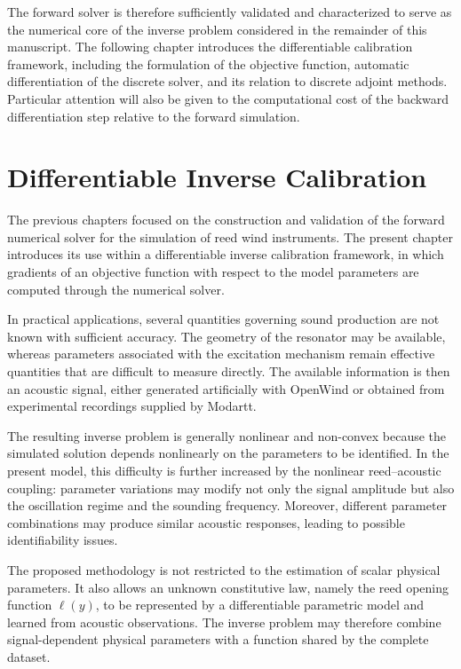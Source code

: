 \documentclass[11pt,a4paper]{report}
\theoremstyle{plain}
\theoremstyle{definition}
\begin{document}
The forward solver is therefore sufficiently validated and characterized to
serve as the numerical core of the inverse problem considered in the remainder
of this manuscript. The following chapter introduces the differentiable
calibration framework, including the formulation of the objective function,
automatic differentiation of the discrete solver, and its relation to
discrete adjoint methods. Particular attention will also be given to the
computational cost of the backward differentiation step relative to the
forward simulation.

\chapter{Differentiable Inverse Calibration}
\label{chap:inverse}

\minitoc

The previous chapters focused on the construction and validation of the
forward numerical solver for the simulation of reed wind instruments.
The present chapter introduces its use within a differentiable inverse
calibration framework, in which gradients of an objective function with
respect to the model parameters are computed through the numerical solver.

In practical applications, several quantities governing sound production are
not known with sufficient accuracy. The geometry of the resonator may be
available, whereas parameters associated with the excitation mechanism remain
effective quantities that are difficult to measure directly. The available
information is then an acoustic signal, either generated artificially with
OpenWind or obtained from experimental recordings supplied by Modartt.

The resulting inverse problem is generally nonlinear and non-convex because
the simulated solution depends nonlinearly on the parameters to be identified.
In the present model, this difficulty is further increased by the nonlinear
reed--acoustic coupling: parameter variations may modify not only the signal
amplitude but also the oscillation regime and the sounding frequency.
Moreover, different parameter combinations may produce similar acoustic
responses, leading to possible identifiability issues.

The proposed methodology is not restricted to the estimation of scalar physical
parameters. It also allows an unknown constitutive law, namely the reed opening
function \(\ell(y)\), to be represented by a differentiable parametric model and
learned from acoustic observations. The inverse problem may therefore combine
signal-dependent physical parameters with a function shared by the complete
dataset.
\end{document}
